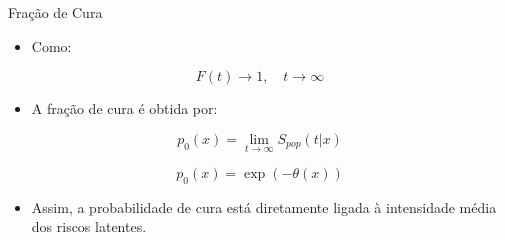 \documentclass[aspectratio=169,t,xcolor=table]{beamer}
\begin{document}
\begin{frame}{Fração de Cura}

\begin{itemize}
\item Como:
\end{itemize}

\[
F(t)\to 1, \quad t\to\infty
\]

\vspace{0.4cm}

\begin{itemize}
\item A fração de cura é obtida por:
\end{itemize}

\[
p_0(x)=\lim_{t\to\infty}S_{pop}(t|x)
\]

\[
p_0(x)=\exp(-\theta(x))
\]

\vspace{0.4cm}

\begin{itemize}
\item Assim, a probabilidade de cura está diretamente ligada à intensidade média dos riscos latentes.
\end{itemize}

\end{frame}







\end{document}
